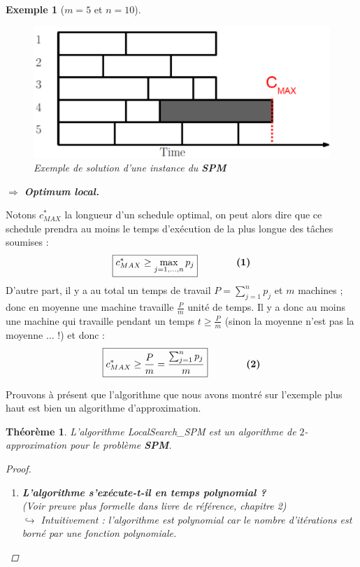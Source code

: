 \documentclass{article}
\newcommand{\titre}[1]{\textcolor{title}{#1}}
\newtheorem{exemple}{Exemple}[section]
\newtheorem{thm}{Th\'eor\`eme}[section]
\newtheorem{proof}{Preuve}[section]
\begin{document}
\begin{sffamily}
\begin{exemple}[$m=5$ et $n=10$]
\begin{figure}[h!]
    \begin{center}
    \includegraphics[scale=0.5]{spm2.pdf}
    \caption{Exemple de solution d'une instance du \textbf{\titre{SPM}}}
    \end{center}
\end{figure}

$\Longrightarrow$ \textbf{Optimum local.}
\end{exemple}

\newpage

Notons $c^*_{MAX}$ la longueur d'un schedule optimal, on peut alors dire que ce schedule prendra au moins le temps d'exécution de la plus
longue des tâches soumises :
$$\boxed{c^*_{MAX} \geq \max_{j=1,\ldots,n} p_j} \qquad\qquad \text{\textbf{(1)}}$$
D'autre part, il y a au total un temps de travail $P = \sum_{j=1}^n p_j$ et $m$ machines ; donc en
moyenne une machine travaille $\frac{P}{m}$ unité de temps. Il y a donc au moins
une machine qui travaille pendant un temps $t \geq \frac{P}{m}$ (sinon la moyenne n'est pas la moyenne $\ldots$ !) et donc :
$$\boxed{c^*_{MAX} \geq \frac{P}{m} = \frac{\sum_{j=1}^n p_j}{m}} \qquad\qquad \text{\textbf{(2)}}$$

Prouvons à présent que l'algorithme que nous avons montré sur l'exemple plus haut est bien un algorithme d'approximation.

\begin{thm}L'algorithme LocalSearch\_SPM est un algorithme de $2$-approximation pour le problème \textbf{\titre{SPM}}.
\begin{proof}$ $\\
\begin{enumerate}
\item \textbf{L'algorithme s'exécute-t-il en temps polynomial ?}\\ (Voir preuve plus formelle dans livre de référence, chapitre 2) \\
$\hookrightarrow$ Intuitivement : l'algorithme est polynomial car le nombre d'itérations est borné par une fonction polynomiale.


\end{enumerate}
\end{proof}
\end{thm}
\end{sffamily}
\end{document}
